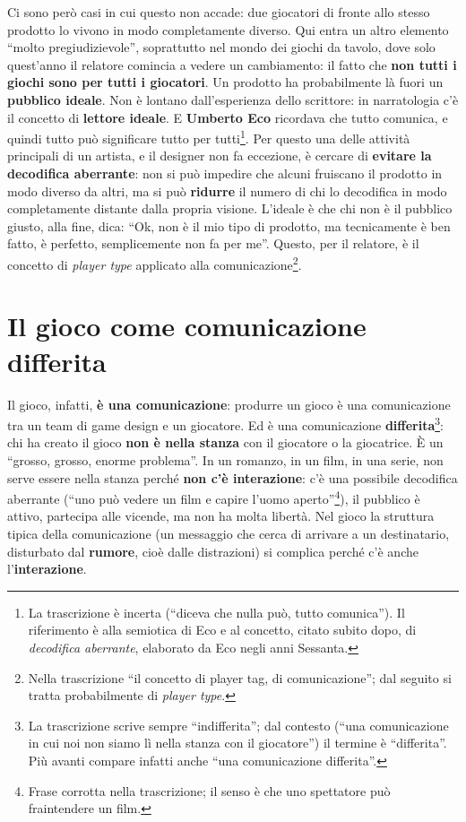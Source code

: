 Ci sono però casi in cui questo non accade: due giocatori di fronte allo stesso
prodotto lo vivono in modo completamente diverso. Qui entra un altro elemento
``molto pregiudizievole'', soprattutto nel mondo dei giochi da tavolo, dove
solo quest'anno il relatore comincia a vedere un cambiamento: il fatto che
\textbf{non tutti i giochi sono per tutti i giocatori}. Un prodotto ha
probabilmente là fuori un \textbf{pubblico ideale}. Non è lontano
dall'esperienza dello scrittore: in narratologia c'è il concetto di
\textbf{lettore ideale}. E \textbf{Umberto Eco} ricordava che tutto comunica, e
quindi tutto può significare tutto per tutti\footnote{La trascrizione è
incerta (``diceva che nulla può, tutto comunica''). Il riferimento è alla
semiotica di Eco e al concetto, citato subito dopo, di \emph{decodifica
aberrante}, elaborato da Eco negli anni Sessanta.}. Per questo una delle
attività principali di un artista, e il designer non fa eccezione, è cercare di
\textbf{evitare la decodifica aberrante}: non si può impedire che alcuni fruiscano
il prodotto in modo diverso da altri, ma si può \textbf{ridurre} il numero di chi
lo decodifica in modo completamente distante dalla propria visione. L'ideale è
che chi non è il pubblico giusto, alla fine, dica: ``Ok, non è il mio tipo di
prodotto, ma tecnicamente è ben fatto, è perfetto, semplicemente non fa per
me''. Questo, per il relatore, è il concetto di \emph{player type} applicato
alla comunicazione\footnote{Nella trascrizione ``il concetto di player tag, di
comunicazione''; dal seguito si tratta probabilmente di \emph{player type}.}.

\section{Il gioco come comunicazione differita}
\label{sec:z6-comunicazione}

Il gioco, infatti, \textbf{è una comunicazione}: produrre un gioco è una
comunicazione tra un team di game design e un giocatore. Ed è una comunicazione
\textbf{differita}\footnote{La trascrizione scrive sempre ``indifferita'';
dal contesto (``una comunicazione in cui noi non siamo lì nella stanza con il
giocatore'') il termine è ``differita''. Più avanti compare infatti anche ``una
comunicazione differita''.}: chi ha creato il gioco \textbf{non è nella stanza}
con il giocatore o la giocatrice. È un ``grosso, grosso, enorme problema''. In
un romanzo, in un film, in una serie, non serve essere nella stanza perché
\textbf{non c'è interazione}: c'è una possibile decodifica aberrante (``uno può
vedere un film e capire l'uomo aperto''\footnote{Frase corrotta nella
trascrizione; il senso è che uno spettatore può fraintendere un film.}), il
pubblico è attivo, partecipa alle vicende, ma non ha molta libertà. Nel gioco la
struttura tipica della comunicazione (un messaggio che cerca di arrivare a un
destinatario, disturbato dal \textbf{rumore}, cioè dalle distrazioni) si
complica perché c'è anche l'\textbf{interazione}.


